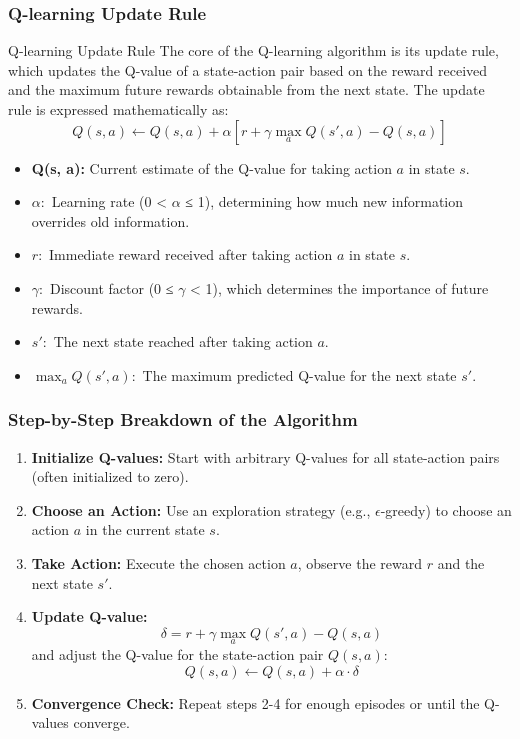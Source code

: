 \documentclass[aspectratio=169]{beamer}
\begin{document}
\begin{frame}[fragile]
    \frametitle{Q-learning Update Rule}
    \begin{block}{Q-learning Update Rule}
        The core of the Q-learning algorithm is its update rule, which updates the Q-value of a state-action pair based on the reward received and the maximum future rewards obtainable from the next state. The update rule is expressed mathematically as:
        \[
        Q(s, a) \leftarrow Q(s, a) + \alpha \left[ r + \gamma \max_a Q(s', a) - Q(s, a) \right]
        \]
    \end{block}
    
    \begin{itemize}
        \item \textbf{Q(s, a):} Current estimate of the Q-value for taking action \(a\) in state \(s\).
        \item \(\alpha:\) Learning rate (0 < \(\alpha\) ≤ 1), determining how much new information overrides old information.
        \item \(r:\) Immediate reward received after taking action \(a\) in state \(s\).
        \item \(\gamma:\) Discount factor (0 ≤ \(\gamma\) < 1), which determines the importance of future rewards.
        \item \(s':\) The next state reached after taking action \(a\).
        \item \(\max_a Q(s', a):\) The maximum predicted Q-value for the next state \(s'\).
    \end{itemize}
\end{frame}

\begin{frame}[fragile]
    \frametitle{Step-by-Step Breakdown of the Algorithm}
    \begin{enumerate}
        \item \textbf{Initialize Q-values:} Start with arbitrary Q-values for all state-action pairs (often initialized to zero).
        \item \textbf{Choose an Action:} Use an exploration strategy (e.g., $\epsilon$-greedy) to choose an action \(a\) in the current state \(s\).
        \item \textbf{Take Action:} Execute the chosen action \(a\), observe the reward \(r\) and the next state \(s'\).
        \item \textbf{Update Q-value:} 
        \[
        \delta = r + \gamma \max_a Q(s', a) - Q(s, a)
        \]
        and adjust the Q-value for the state-action pair \(Q(s, a)\):
        \[
        Q(s, a) \leftarrow Q(s, a) + \alpha \cdot \delta
        \]
        \item \textbf{Convergence Check:} Repeat steps 2-4 for enough episodes or until the Q-values converge.
    \end{enumerate}
\end{frame}
\end{document}
